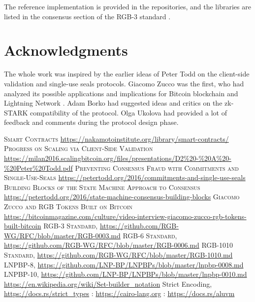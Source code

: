 \documentclass[9pt,oneside]{amsart}
\begin{document}
\begin{multicols}{2}
The reference implementation is provided in the repositories, and the libraries are listed
in the consensus section of the RGB-3 standard \cite{RGB3}.

\section{Acknowledgments}
The whole work was inspired by the earlier ideas of Peter Todd on the client-side validation \cite{CSV}
and single-use seals \cite{SUS1, SUS2} protocols. Giacomo Zucco was the first, who had analyzed its possible
applications and implications for Bitcoin blockchain and Lightning Network \cite{Zucco}.
Adam Borko had suggested ideas and critics on the zk-STARK compatibility of the protocol.
Olga Ukolova had provided a lot of feedback and comments during the protocol design phase.



\begin{thebibliography}{9}
 \textsc{Smart Contracts} \url{https://nakamotoinstitute.org/library/smart-contracts/}
 \textsc{Progress on Scaling via Client-Side Validation} \url{https://milan2016.scalingbitcoin.org/files/presentations/D2%20-%20A%20-%20Peter%20Todd.pdf}
 \textsc{Preventing Consensus Fraud with Commitments and Single-Use-Seals} \url{https://petertodd.org/2016/commitments-and-single-use-seals}
 \textsc{Building Blocks of the State Machine Approach to Consensus} \url{https://petertodd.org/2016/state-machine-consensus-building-blocks}
 \textsc{Giacomo Zucco and RGB Tokens Built on Bitcoin} \url{https://bitcoinmagazine.com/culture/video-interview-giacomo-zucco-rgb-tokens-built-bitcoin}
 \textsc{RGB-3 Standard}, \url{https://github.com/RGB-WG/RFC/blob/master/RGB-0003.md}
 \textsc{RGB-6 Standard}, \url{https://github.com/RGB-WG/RFC/blob/master/RGB-0006.md}
 \textsc{RGB-1010 Standard}, \url{https://github.com/RGB-WG/RFC/blob/master/RGB-1010.md}
 \textsc{LNPBP-8}, \url{https://github.com/LNP-BP/LNPBPs/blob/master/lnpbp-0008.md}
 \textsc{LNPBP-10}, \url{https://github.com/LNP-BP/LNPBPs/blob/master/lnpbp-0010.md}
 \url{https://en.wikipedia.org/wiki/Set-builder_notation}
 Strict Encoding, \url{https://docs.rs/strict_types}
: \url{https://cairo-lang.org}
: \url{https://docs.rs/aluvm}
\end{thebibliography}

\end{multicols}
\end{document}
